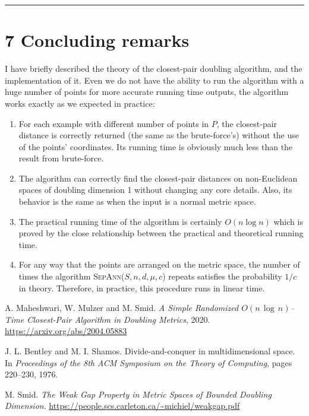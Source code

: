\documentclass[12pt,english,]{article}
\providecommand{\tightlist}{%
  \setlength{\itemsep}{0pt}\setlength{\parskip}{0pt}}
\begin{document}
\hrule

\hypertarget{section7}{%
\section{\texorpdfstring{7 \enspace Concluding
remarks}{7 Concluding remarks}}\label{section7}}

I have briefly described the theory of the closest-pair doubling
algorithm, and the implementation of it. Even we do not have the ability
to run the algorithm with a huge number of points for more accurate
running time outputs, the algorithm works exactly as we expected in
practice:

\begin{enumerate}
\def\labelenumi{\arabic{enumi}.}
\tightlist
\item
  For each example with different number of points in \(P\), the
  closest-pair distance is correctly returned (the same as the
  brute-force's) without the use of the points' coordinates. Its running
  time is obviously much less than the result from brute-force.
\item
  The algorithm can correctly find the closest-pair distances on
  non-Euclidean spaces of doubling dimension 1 without changing any core
  details. Also, its behavior is the same as when the input is a normal
  metric space.
\item
  The practical running time of the algorithm is certainly
  \(O(n\log n)\) which is proved by the close relationship between the
  practical and theoretical running time.
\item
  For any way that the points are arranged on the metric space, the
  number of times the algorithm \textsc{SepAnn($S,n,d,\mu,c$)} repeats
  satisfies the probability \(1/c\) in theory. Therefore, in practice,
  this procedure runs in linear time.
\end{enumerate}

\medskip

\begin{thebibliography}{9}
A. Maheshwari, W. Mulzer and M. Smid. \emph{A Simple Randomized $O(n\,\log\,n)$–Time Closest-Pair Algorithm in Doubling Metrics}, 2020. \url{https://arxiv.org/abs/2004.05883}

J. L. Bentley and M. I. Shamos. Divide-and-conquer in multidimensional space. In \emph{Proceedings of the 8th ACM Symposium on the Theory of Computing}, pages 220–230,
1976.

M. Smid. \emph{The Weak Gap Property in Metric Spaces of Bounded Doubling Dimension}. \url{https://people.scs.carleton.ca/~michiel/weakgap.pdf}

\end{thebibliography}
\end{document}
